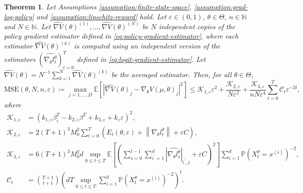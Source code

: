 \documentclass[11pt]{article}
\numberwithin{equation}{section}
\newtheorem{theorem}{Theorem}[section]
\theoremstyle{definition}
\theoremstyle{remark}
\def\eps{\varepsilon}
\begin{document}
\begin{theorem}
\label{theorem:main-mse-result}
Let Assumptions \ref{assumption:finite-state-space}, \ref{assumption:grad-log-policy} and \ref{assumption:lipschitz-reward} hold.
Let $\eps \in (0,1)$, $\theta \in \Theta$, $n \in \mathbb N$ and $N \in \mathbb N$.
Let $\widehat{\nabla V}(\theta)^{(1)}, \ldots, \widehat{\nabla V}(\theta)^{(N)}$ be $N$ independent copies of the policy gradient estimator defined in \eqref{eq:policy-gradient-estimator},
where each estimator $ \widehat{\nabla V}(\theta)^{(k)}$ is computed using an independent version of the estimators $\left(\widehat{\nabla_\theta l_t^\theta} \right)_{t=0}^T$ defined in \eqref{eq:logit-gradient-estimator}.
Let $\widehat{\nabla V}(\theta) = N^{-1} \sum_{k=1}^N \widehat{\nabla V}(\theta)^{(k)}$ be the averaged estimator.
Then, for all $\theta \in \Theta$,
\begin{equation}
\label{eq:mse-bound}
    \mathrm{MSE}(\theta, N, n, \eps) \coloneq \max_{j = 1, \ldots, D}\mathbb E \left[\left| \widehat{\nabla V}(\theta)_j - \nabla_\theta V (\mu, \theta)_j \right|^2 \right] \leq  \mathcal K_{1, \eps} \eps^2 + \frac{\mathcal K_{2, \eps}}{ N \eps^2} + \frac{\mathcal K_{3, \eps}}{n N \eps^4}  \sum_{t = 0}^T  \mathcal{C}_t\eps^{-2 t},
\end{equation}
where
\begin{equation}
    \label{eq:constants-main-mse-result}
    \begin{aligned}
  \mathcal K_{1, \eps} &= \left( k_{1,\eps}  \beta_\eps^T - k_{2,\eps} \beta^T + k_{3,\eps} + k_{\eps} \eps \right)^2, \\ 
  \mathcal K_{2, \eps} &=  2 (T + 1)^3 M_0^2 \sum_{t = 0}^T \left(E_t(\theta, \eps) + \left\| \nabla_\theta l_t^\theta \right\| +  \eps C\right),\\
  \mathcal K_{3,\eps} & =  6 (T + 1)^3 M_0^2 d  \sup_{0 \leq t \leq T} \mathbb E \left[ \left(\sum_{s = 0}^{t-1} \sum_{i^\prime = 1}^d  \left|\widehat{\nabla_\theta l_s^\theta}\right|_{i^\prime,j}  + \eps C\right)^2 \right] \sum_{i=1}^d \mathbb P \left( X_t^\theta = x^{(i)} \right)^{-2}, \\
  \mathcal C_t &= \binom{T + 1}{t + 1}\left(   d T \sup_{0 \leq t \leq T} \sum_{i=1}^d \mathbb P \left( X_t^\theta = x^{(i)} \right)^{-2} \right)^t.
\end{aligned} 
\end{equation}
\end{theorem}
\end{document}
